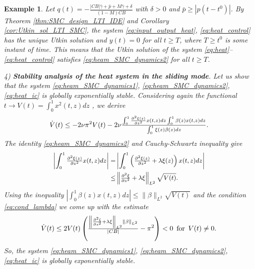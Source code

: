 \documentclass{article}
\newtheorem{example}{Example}
\begin{document}
{\begin{example}
  Let $q(t)=-\frac{|CB| \bar \gamma+\bar p+M\bar \gamma+\delta}{(1-M)CB}$ with  $\delta>0$ and $ \bar p\geq |p(t-t^0)|$.
 By Theorem \ref{thm:SMC_design_LTI_IDE} and Corollary \ref{cor:Utkin_sol_LTI_SMC},  
 the system \eqref{eq:input_output_heat}, \eqref{eq:heat_control} has the unique Utkin solution and $y(t)=0$ for all $t\geq T$, where $T\geq t^0$ is some instant of time. This means that   the Utkin solution of the system  \eqref{eq:heat}--\eqref{eq:heat_control}  satisfies  \eqref{eq:heam_SMC_dynamics2}  for all $t\geq T$.
 
 4) \textbf{Stability analysis of the heat system in the sliding mode}.	
Let us show that the system  \eqref{eq:heam_SMC_dynamics1}, \eqref{eq:heam_SMC_dynamics2}, \eqref{eq:heat_ic} is globally exponentially  stable. Considering again the functional $t\to V(t)=\int^1_0 x^2(t,z)dz$ ,  we derive\vspace{-1mm}
\[
\dot V(t)\leq -2\nu \pi^2  V(t)-2\nu \tfrac{ \int^1_0 \frac{\partial^2 \xi(z)}{\partial z^2} x(t,z)dz\int^1_0\beta(z)x(t,z)dz}{\int^1_0 \xi(z)\beta(z)dz}.\vspace{-1mm}
\]
The identity \eqref{eq:heam_SMC_dynamics2}  and Cauchy-Schwartz inequality give \vspace{-1mm}
\[\small \vspace{-1mm}
\begin{split}
\left| \int^1_0 \tfrac{\partial^2 \xi(z)}{\partial z^2} x(t,z)dz\right|=&
\left|\int^1_0 \left(\tfrac{\partial^2 \xi(z)}{\partial z^2}+\lambda  \xi(z)\right) x(t,z)dz\right|\\
 \leq &\left\|\tfrac{\partial^2 \xi}{\partial z^2}+\lambda \xi \right\|_{L^2} \sqrt{V(t)}.\vspace{-1mm}
\end{split}
\]
Using the inequality $\left|\int^1_0 \beta(z)x(t,z) dz\right|\leq \|\beta\|_{L^2}\sqrt{V(t)}$ and the condition  \eqref{eq:cond_lambda} we come up with the estimate \vspace{-1mm}
\[
\dot V(t)\leq 2V(t)\left(\tfrac{\left\|\frac{\partial^2 \xi}{\partial z^2}+\lambda \xi \right\|_{L^2} \|\beta\|_{L^2}}{|CB|}-\pi^2\right)<0\, \text{ for }\, V(t)\neq 0.\vspace{-1mm}\]
So, the system \eqref{eq:heam_SMC_dynamics1}, \eqref{eq:heam_SMC_dynamics2}, \eqref{eq:heat_ic} is globally exponentially stable.


\end{example}}
\end{document}
